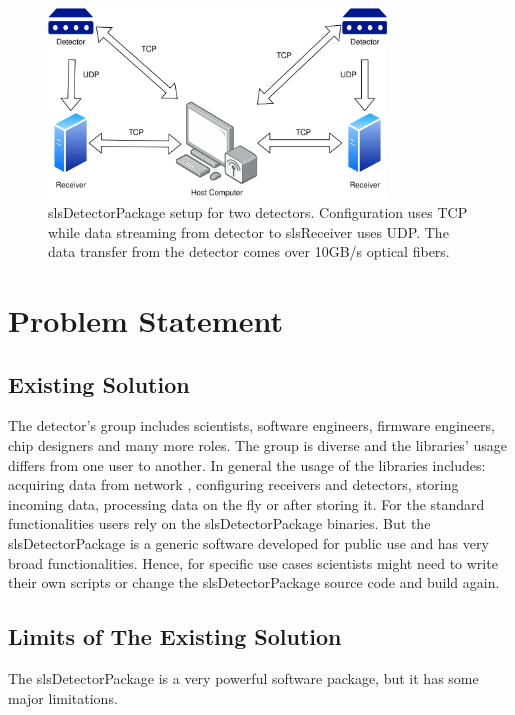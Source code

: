 \begin{spacing}{1.2}
    \begin{figure}[h]
        \centering
        \includegraphics[width=0.8\textwidth]{Chapitre1/figures/slsreceiver.png}
        \caption{slsDetectorPackage setup for two detectors. Configuration uses TCP while
            data streaming from detector to slsReceiver uses UDP. The data transfer from the detector
            comes over 10GB/s optical fibers.}
        \label{fig:detector}
    \end{figure}

    \section{Problem Statement}
    \subsection{Existing Solution}
    The detector's group includes scientists, software engineers, firmware engineers, chip designers and many more roles.
    The group is diverse and the libraries' usage differs from one user to another. In general the usage of the libraries includes: acquiring data from network
    , configuring receivers and detectors, storing incoming data, processing data on the fly or after storing it.
    For the standard functionalities users rely on the slsDetectorPackage binaries. But the slsDetectorPackage is a generic software
    developed for public use and has very broad functionalities. Hence, for specific use cases scientists might need to write their own scripts
    or change the slsDetectorPackage source code and build again.
    \subsection{Limits of The Existing Solution}
    The slsDetectorPackage is a very powerful software package, but it has some major limitations.

\end{spacing}
